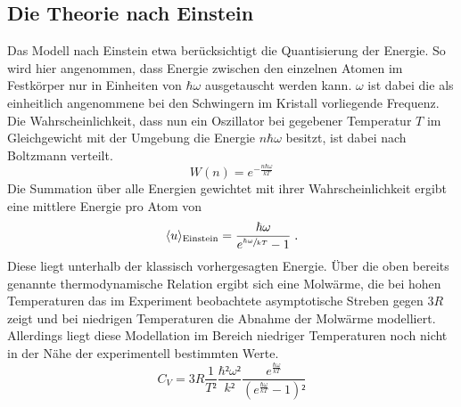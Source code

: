 \subsection{Die Theorie nach Einstein}
%
Das Modell nach Einstein etwa berücksichtigt die Quantisierung der Energie. So wird hier angenommen, dass Energie zwischen den einzelnen Atomen im Festkörper nur in Einheiten von $\hbar\omega$ ausgetauscht werden kann. $\omega$ ist dabei die als einheitlich angenommene bei den Schwingern im Kristall vorliegende Frequenz. Die Wahrscheinlichkeit, dass nun ein Oszillator bei gegebener Temperatur $T$ im Gleichgewicht mit der Umgebung die Energie $n\hbar\omega$ besitzt, ist dabei nach Boltzmann verteilt.
%
\begin{equation}
  W(n)=e^{-\frac{n\hbar\omega}{kT}}
\end{equation}
%
Die Summation über alle Energien gewichtet mit ihrer Wahrscheinlichkeit ergibt eine mittlere Energie pro Atom von
%
\begin{equation}
  \langle u\rangle_\text{Einstein}=\frac{\hbar\omega}{e^{\sfrac{\hbar\omega}{kT}}-1}\;\text{.}
\end{equation}
%
Diese liegt unterhalb der klassisch vorhergesagten Energie. Über die oben bereits genannte thermodynamische Relation ergibt sich eine Molwärme, die bei hohen Temperaturen das im Experiment beobachtete asymptotische Streben gegen $3R$ zeigt und bei niedrigen Temperaturen die Abnahme der Molwärme modelliert. Allerdings liegt diese Modellation im Bereich niedriger Temperaturen noch nicht in der Nähe der experimentell bestimmten Werte.
%
\begin{equation}
  C_V=3R\frac{1}{T²}\frac{\hbar²\omega²}{k²}\frac{e^{\frac{\hbar\omega}{kT}}}{(e^{\frac{\hbar\omega}{kT}}-1)²}
\end{equation}
%
